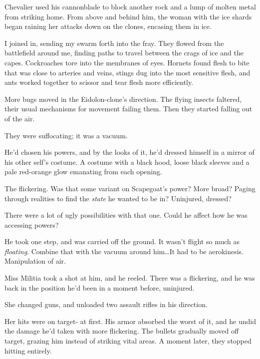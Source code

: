 Chevalier used his cannonblade to block another rock and a lump of molten metal from striking home.  From above and behind him, the woman with the ice shards began raining her attacks down on the clones, encasing them in ice.



I joined in, sending my swarm forth into the fray.  They flowed from the battlefield around me, finding paths to travel between the crags of ice and the capes.  Cockroaches tore into the membranes of eyes.  Hornets found flesh to bite that was close to arteries and veins, stings dug into the most sensitive flesh, and ants worked together to scissor and tear flesh more efficiently.



More bugs moved in the Eidolon-clone's direction.  The flying insects faltered, their usual mechanisms for movement failing them.  Then they started falling out of the air.



They were suffocating; it was a vacuum.



He'd chosen his powers, and by the looks of it, he'd dressed himself in a mirror of his other self's costume.  A costume with a black hood, loose black sleeves and a pale red-orange glow emanating from each opening.



The flickering.  Was that some variant on Scapegoat's power?  More broad?  Paging through realities to find the \emph{state} he wanted to be in?  Uninjured, dressed?



There were a lot of ugly possibilities with that one.  Could he affect how he was accessing powers?



He took one step, and was carried off the ground.  It wasn't flight so much as \emph{floating}.  Combine that with the vacuum around him\ldots It had to be aerokinesis.  Manipulation of air.



Miss Militia took a shot at him, and he reeled.  There was a flickering, and he was back in the position he'd been in a moment before, uninjured.



She changed guns, and unloaded two assault rifles in his direction.



Her hits were on target- at first.  His armor absorbed the worst of it, and he undid the damage he'd taken with more flickering.  The bullets gradually moved off target, grazing him instead of striking vital areas.  A moment later, they stopped hitting entirely.



